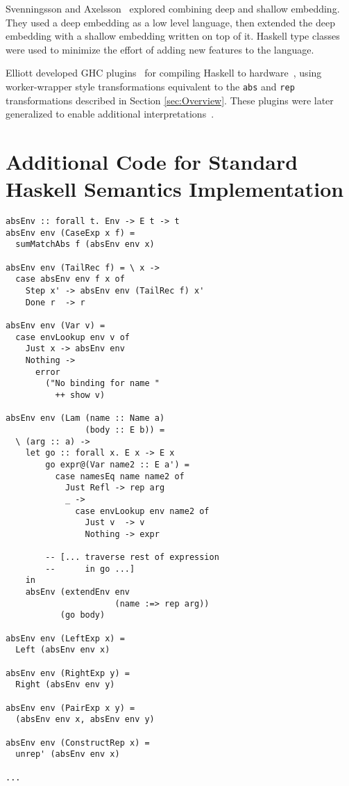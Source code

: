 \documentclass[sigplan,anonymous,review]{acmart}
\begin{document}
Svenningsson and Axelsson~\cite{Svenningsson:13:Combining}
explored combining deep and shallow embedding.  They used
a deep embedding as a low level language, then extended
the deep embedding with a shallow embedding written on top
of it. Haskell type classes were used to minimize the effort of adding
new features to the language.

Elliott developed GHC plugins~\cite{github:lambda-ccc}\cite{github:reification-rules}
for compiling Haskell to hardware~\cite{github:Elliott:Talk:2015},
using worker-wrapper style transformations equivalent to the \verb|abs| and
\verb|rep| transformations described in Section \ref{sec:Overview}. These plugins were later generalized to enable additional interpretations~\cite{Elliott:2017}.





\appendix
\section{Additional Code for Standard Haskell Semantics Implementation}
\begin{lstlisting}
absEnv :: forall t. Env -> E t -> t
absEnv env (CaseExp x f) =
  sumMatchAbs f (absEnv env x)

absEnv env (TailRec f) = \ x ->
  case absEnv env f x of
    Step x' -> absEnv env (TailRec f) x'
    Done r  -> r

absEnv env (Var v) =
  case envLookup env v of
    Just x -> absEnv env
    Nothing ->
      error
        ("No binding for name "
          ++ show v)

absEnv env (Lam (name :: Name a)
                (body :: E b)) =
  \ (arg :: a) ->
    let go :: forall x. E x -> E x
        go expr@(Var name2 :: E a') =
          case namesEq name name2 of
            Just Refl -> rep arg
            _ ->
              case envLookup env name2 of
                Just v  -> v
                Nothing -> expr

        -- [... traverse rest of expression
        --      in go ...]
    in
    absEnv (extendEnv env
                      (name :=> rep arg))
           (go body)

absEnv env (LeftExp x) =
  Left (absEnv env x)

absEnv env (RightExp y) =
  Right (absEnv env y)

absEnv env (PairExp x y) =
  (absEnv env x, absEnv env y)

absEnv env (ConstructRep x) =
  unrep' (absEnv env x)

...
\end{lstlisting}
\end{document}
